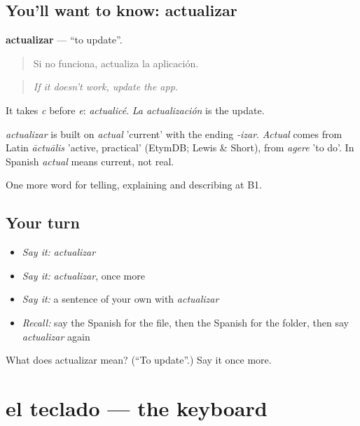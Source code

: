 \subsection*{You'll want to know: actualizar}
\textbf{actualizar} — \textquotedblleft{}to update\textquotedblright{}.

\begin{quote}
Si no funciona, actualiza la aplicación.
\end{quote}

\begin{quote}
\emph{If it doesn't work, update the app.}
\end{quote}

It takes \emph{c} before \emph{e}: \emph{actualicé}. \emph{La actualización} is the update.

\begin{cousinweb}
\emph{actualizar} is built on \emph{actual} 'current' with the ending \emph{-izar}. \emph{Actual} comes from Latin \emph{āctuālis} 'active, practical' (EtymDB; Lewis \& Short), from \emph{agere} 'to do'. In Spanish \emph{actual} means current, not real.
\end{cousinweb}

\begin{grammarlens}[title={What you've built}]
One more word for telling, explaining and describing at B1.
\end{grammarlens}

\subsection*{Your turn}
\begin{itemize}
\raggedright
  \item \emph{Say it:} \emph{actualizar}
  \item \emph{Say it:} \emph{actualizar}, once more
  \item \emph{Say it:} a sentence of your own with \emph{actualizar}
  \item \emph{Recall:} say the Spanish for the file, then the Spanish for the folder, then say \emph{actualizar} again
\end{itemize}

\begin{tcolorbox}[breakable,colback=teal!4,colframe=teal!35!black,title={Before you move on}]
What does actualizar mean? (\textquotedblleft{}To update\textquotedblright{}.) Say it once more.
\end{tcolorbox}
\section[el teclado]{el teclado — the keyboard}

